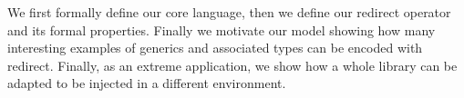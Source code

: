 We first formally define our core language, then we define our redirect operator and
its formal properties.
Finally we motivate our model showing
how many interesting examples of generics and associated types can be encoded with redirect. Finally, as
an extreme application,
we show how a whole library can be adapted to be injected in a different environment.



%  
%
%
%
%
%  
%
%
%
%
%


